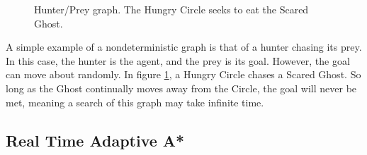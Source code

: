 \documentclass[tog]{acmsiggraph}
\begin{document}
\begin{figure}
  \centering
  \caption{Hunter/Prey graph. The Hungry Circle seeks to eat the Scared Ghost.}
  \label{fig:hungrycircle}
\end{figure}

A simple example of a nondeterministic graph is that of a hunter
chasing its prey. In this case, the hunter is the agent, and the prey
is its goal. However, the goal can move about randomly. In figure
\ref{fig:hungrycircle}, a Hungry Circle chases a Scared Ghost. So long
as the Ghost continually moves away from the Circle, the goal will
never be met, meaning a search of this graph may take infinite time.

\subsection{Real Time Adaptive A*}
\end{document}
